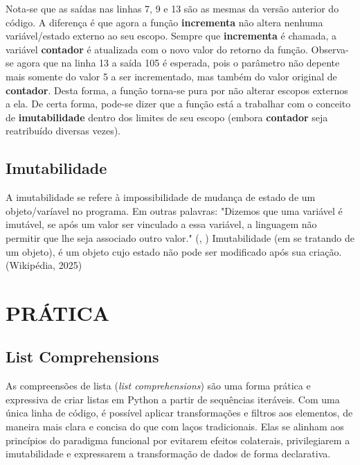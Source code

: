 \documentclass[date,twocolumn,a4paper]{ppgem}
\begin{document}
    Nota-se que as saídas nas linhas 7, 9 e 13 são as mesmas da versão anterior do código. A diferença é que agora a função
    \textbf{incrementa} não altera nenhuma variável/estado externo ao seu escopo. Sempre que \textbf{incrementa} é chamada,
    a variável \textbf{contador} é atualizada com o novo valor do retorno da função. Observa-se agora que na linha 13 a saída
    105 é esperada, pois o parâmetro não depente mais somente do valor 5 a ser incrementado, mas também do valor original de
    \textbf{contador}.
    Desta forma, a função torna-se pura por não alterar escopos externos a ela. De certa forma, pode-se dizer que a função está a trabalhar
    com o conceito de \textbf{imutabilidade} dentro dos limites de seu escopo (embora \textbf{contador} seja reatribuído diversas vezes).

    \subsection{Imutabilidade}
        A imutabilidade se refere à impossibilidade de mudança de estado de um objeto/varíavel no programa. Em outras palavras: "Dizemos que uma variável é imutável, se após um valor ser vinculado a essa variável, a linguagem não permitir que lhe seja associado outro valor." (\citeauthor{queiroz_func_prog}, \citeyear{queiroz_func_prog})
        Imutabilidade (em se tratando de um objeto), é um objeto cujo estado não pode ser modificado após sua criação. (Wikipédia, 2025)\cite{wiki_immutable}
    
    
    \section{PRÁTICA}

    \subsection{List Comprehensions}
    As compreensões de lista (\textit{list comprehensions}) são uma forma prática e expressiva de criar listas em Python a partir de sequências iteráveis. Com uma única linha de código, é possível aplicar transformações e filtros aos elementos, de maneira mais clara e concisa do que com laços tradicionais. Elas se alinham aos princípios do paradigma funcional por evitarem efeitos colaterais, privilegiarem a imutabilidade e expressarem a transformação de dados de forma declarativa.
\end{document}
